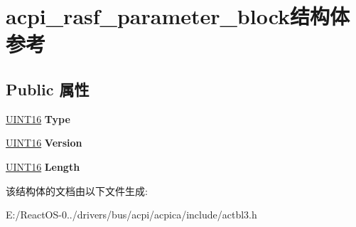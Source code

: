 \hypertarget{structacpi__rasf__parameter__block}{}\section{acpi\+\_\+rasf\+\_\+parameter\+\_\+block结构体 参考}
\label{structacpi__rasf__parameter__block}
\subsection*{Public 属性}
\begin{DoxyCompactItemize}
\item 
\mbox{\label{structacpi__rasf__parameter__block_a07651dd5ab0182600e3f4a08960d12a1}} 
\hyperlink{_processor_bind_8h_a09f1a1fb2293e33483cc8d44aefb1eb1}{U\+I\+N\+T16} {\bfseries Type}
\item 
\mbox{\label{structacpi__rasf__parameter__block_a0b2dd834659e73797aa658d2ad4348c6}} 
\hyperlink{_processor_bind_8h_a09f1a1fb2293e33483cc8d44aefb1eb1}{U\+I\+N\+T16} {\bfseries Version}
\item 
\mbox{\label{structacpi__rasf__parameter__block_ab2081737c47726650f3adbb0ea7261b6}} 
\hyperlink{_processor_bind_8h_a09f1a1fb2293e33483cc8d44aefb1eb1}{U\+I\+N\+T16} {\bfseries Length}
\end{DoxyCompactItemize}


该结构体的文档由以下文件生成\+:\begin{DoxyCompactItemize}
\item 
E\+:/\+React\+O\+S-\/0../drivers/bus/acpi/acpica/include/actbl3.\+h\end{DoxyCompactItemize}
